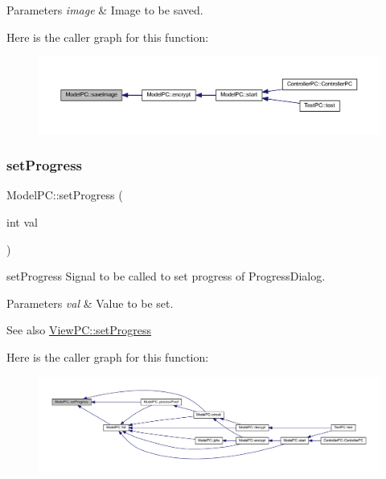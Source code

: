 \begin{DoxyParams}{Parameters}
{\em image} & Image to be saved. \\
\hline
\end{DoxyParams}
Here is the caller graph for this function\+:
\nopagebreak
\begin{figure}[H]
\begin{center}
\leavevmode
\includegraphics[width=350pt]{class_model_p_c_a5af79bd5fd50d7be0646778bc99413b9_icgraph}
\end{center}
\end{figure}
\mbox{\label{class_model_p_c_a25a4496e129e87ac96f12257a123b84f}} 
\subsubsection{\texorpdfstring{set\+Progress}{setProgress}}
{\footnotesize\ttfamily Model\+P\+C\+::set\+Progress (\begin{DoxyParamCaption}\item[{int}]{val }\end{DoxyParamCaption})\hspace{0.3cm}{\ttfamily [signal]}}



set\+Progress Signal to be called to set progress of Progress\+Dialog. 


\begin{DoxyParams}{Parameters}
{\em val} & Value to be set. \\
\hline
\end{DoxyParams}
\begin{DoxySeeAlso}{See also}
\mbox{\hyperlink{class_view_p_c_a9c32a1fdb6ead84e5ada8fba8860c7ed}{View\+P\+C\+::set\+Progress}} 
\end{DoxySeeAlso}
Here is the caller graph for this function\+:
\nopagebreak
\begin{figure}[H]
\begin{center}
\leavevmode
\includegraphics[width=350pt]{class_model_p_c_a25a4496e129e87ac96f12257a123b84f_icgraph}
\end{center}
\end{figure}
\mbox{\label{class_model_p_c_a3cae34fd5bcb06e8c1f8cfe7961bd270}} 
